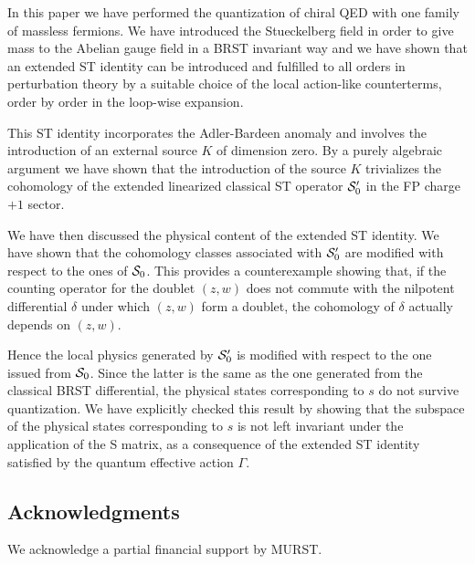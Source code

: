 \documentclass[a4paper,11pt]{article}
\def\G{\Gamma}
\begin{document}
In this paper we have performed the quantization of chiral QED with one family of 
massless fermions.
We have introduced the Stueckelberg field in order to give mass to the
Abelian gauge field in a BRST invariant way and we have shown 
that an extended ST identity can be introduced
and fulfilled to all orders in perturbation theory by a suitable choice
of the local action-like counterterms, order by order in the loop-wise
expansion.

This ST identity incorporates the Adler-Bardeen anomaly and involves the introduction 
of an external source $K$ of dimension zero. By a purely algebraic argument
we have shown that the introduction of the source $K$ trivializes
the cohomology of the extended 
linearized classical ST operator ${\cal S}'_0$ 
in the FP charge $+1$ sector.

We have then discussed the physical content of the extended ST identity.
We have shown that the cohomology classes associated with ${\cal S}'_0$ are modified
with respect to the ones of ${\cal S}_0$. 
This provides a counterexample showing
that, if the counting operator for the doublet $(z,w)$ does not commute with the nilpotent differential
$\delta$ under which $(z,w)$ form a doublet, the cohomology of $\delta$ actually depends on $(z,w)$.

Hence the local physics generated by ${\cal S}'_0$ is modified with respect
to the one issued from ${\cal S}_0$. Since the latter is the same as the one generated from the
classical BRST differential, the physical states corresponding to $s$  do not survive quantization.
We have explicitly checked this result by showing that the subspace of the physical states
corresponding to $s$ is not left invariant under the application of the S matrix,
as a consequence of the extended ST identity satisfied by the quantum effective action $\G$.

\subsection*{Acknowledgments}
We acknowledge a partial financial support by MURST.
%
\end{document}
